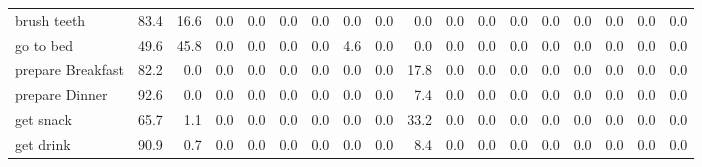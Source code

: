\documentclass{article}
\begin{document}
\begin{sideways}
\begin{tabular}{lrrrrrrrrrrrrrrrrr}
brush teeth                   &        83.4 &               16.6 &           0.0 &               0.0 &                0.0 &                0.0 &              0.0 &                      0.0 &                   0.0 &              0.0 &              0.0 &                            0.0 &                      0.0 &                    0.0 &                                  0.0 &                          0.0 &                  0.0 \\
go to bed                     &        49.6 &               45.8 &           0.0 &               0.0 &                0.0 &                0.0 &              4.6 &                      0.0 &                   0.0 &              0.0 &              0.0 &                            0.0 &                      0.0 &                    0.0 &                                  0.0 &                          0.0 &                  0.0 \\
prepare Breakfast             &        82.2 &                0.0 &           0.0 &               0.0 &                0.0 &                0.0 &              0.0 &                      0.0 &                  17.8 &              0.0 &              0.0 &                            0.0 &                      0.0 &                    0.0 &                                  0.0 &                          0.0 &                  0.0 \\
prepare Dinner                &        92.6 &                0.0 &           0.0 &               0.0 &                0.0 &                0.0 &              0.0 &                      0.0 &                   7.4 &              0.0 &              0.0 &                            0.0 &                      0.0 &                    0.0 &                                  0.0 &                          0.0 &                  0.0 \\
get snack                     &        65.7 &                1.1 &           0.0 &               0.0 &                0.0 &                0.0 &              0.0 &                      0.0 &                  33.2 &              0.0 &              0.0 &                            0.0 &                      0.0 &                    0.0 &                                  0.0 &                          0.0 &                  0.0 \\
get drink                     &        90.9 &                0.7 &           0.0 &               0.0 &                0.0 &                0.0 &              0.0 &                      0.0 &                   8.4 &              0.0 &              0.0 &                            0.0 &                      0.0 &                    0.0 &                                  0.0 &                          0.0 &                  0.0 \\

\end{tabular}
\end{sideways}
\end{document}
